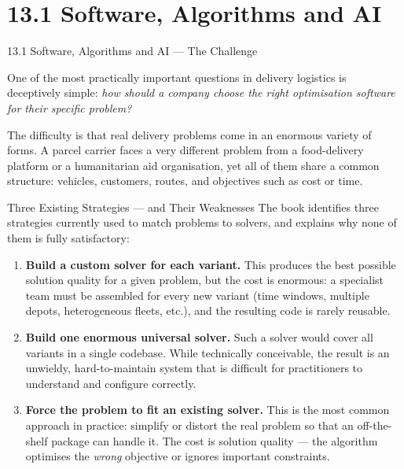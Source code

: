 \documentclass[aspectratio=169,10pt]{beamer}
\begin{document}
\section{13.1 Software, Algorithms and AI}

\begin{frame}[allowframebreaks]{13.1 Software, Algorithms and AI --- The Challenge}

  One of the most practically important questions in delivery logistics
  is deceptively simple: \emph{how should a company choose the right
  optimisation software for their specific problem?}

  \bigskip
  The difficulty is that real delivery problems come in an enormous
  variety of forms.  A parcel carrier faces a very different problem
  from a food-delivery platform or a humanitarian aid organisation,
  yet all of them share a common structure: vehicles, customers, routes,
  and objectives such as cost or time.

  \bigskip
  \begin{block}{Three Existing Strategies --- and Their Weaknesses}
    The book identifies three strategies currently used to match problems
    to solvers, and explains why none of them is fully satisfactory:

    \medskip
    \begin{enumerate}
      \item \textbf{Build a custom solver for each variant.}
            This produces the best possible solution quality for a given
            problem, but the cost is enormous: a specialist team must be
            assembled for every new variant (time windows, multiple depots,
            heterogeneous fleets, etc.), and the resulting code is rarely
            reusable.

      \item \textbf{Build one enormous universal solver.}
            Such a solver would cover all variants in a single codebase.
            While technically conceivable, the result is an unwieldy,
            hard-to-maintain system that is difficult for practitioners
            to understand and configure correctly.

      \item \textbf{Force the problem to fit an existing solver.}
            This is the most common approach in practice: simplify or
            distort the real problem so that an off-the-shelf package
            can handle it.  The cost is solution quality --- the algorithm
            optimises the \emph{wrong} objective or ignores important
            constraints.
    \end{enumerate}
  \end{block}


\end{frame}
\end{document}
